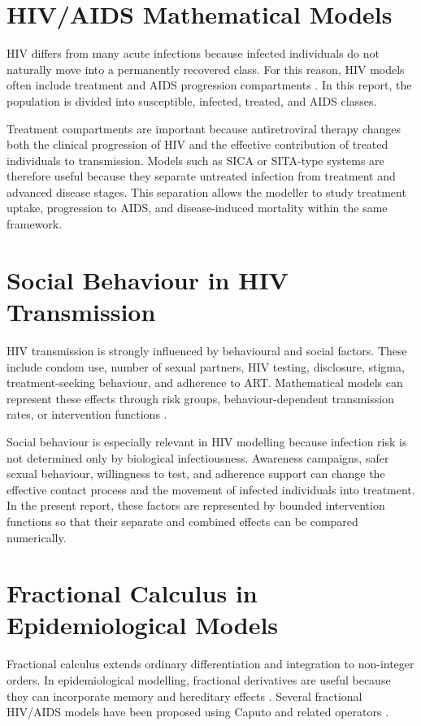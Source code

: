 \documentclass[12pt,a4paper,oneside]{report}
\begin{document}
\section{HIV/AIDS Mathematical Models}
HIV differs from many acute infections because infected individuals do not naturally move into a permanently recovered class. For this reason, HIV models often include treatment and AIDS progression compartments \citep{AndersonMay1991,SilvaTorres2017}. In this report, the population is divided into susceptible, infected, treated, and AIDS classes.

Treatment compartments are important because antiretroviral therapy changes both the clinical progression of HIV and the effective contribution of treated individuals to transmission. Models such as SICA or SITA-type systems are therefore useful because they separate untreated infection from treatment and advanced disease stages. This separation allows the modeller to study treatment uptake, progression to AIDS, and disease-induced mortality within the same framework.

\newpage 

\section{Social Behaviour in HIV Transmission}
HIV transmission is strongly influenced by behavioural and social factors. These include condom use, number of sexual partners, HIV testing, disclosure, stigma, treatment-seeking behaviour, and adherence to ART. Mathematical models can represent these effects through risk groups, behaviour-dependent transmission rates, or intervention functions \citep{Poundstone2004,Supervie2011}.

Social behaviour is especially relevant in HIV modelling because infection risk is not determined only by biological infectiousness. Awareness campaigns, safer sexual behaviour, willingness to test, and adherence support can change the effective contact process and the movement of infected individuals into treatment. In the present report, these factors are represented by bounded intervention functions so that their separate and combined effects can be compared numerically.

\section{Fractional Calculus in Epidemiological Models}
Fractional calculus extends ordinary differentiation and integration to non-integer orders. In epidemiological modelling, fractional derivatives are useful because they can incorporate memory and hereditary effects \citep{Podlubny1999,Kilbas2006,Diethelm2010}. Several fractional HIV/AIDS models have been proposed using Caputo and related operators \citep{Gunerhan2020,Unaegbu2021}.
\end{document}
